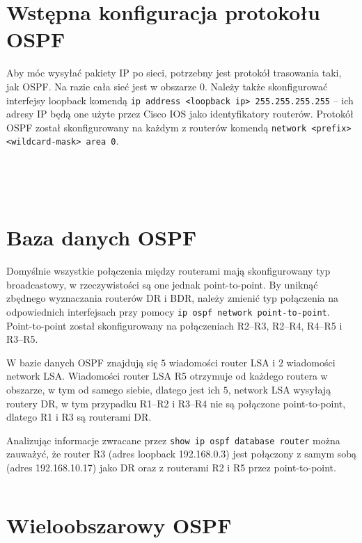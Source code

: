 \documentclass[a4paper,12pt,notitlepage]{article}
\begin{document}
\section{Wstępna konfiguracja protokołu OSPF}

Aby móc wysyłać pakiety IP po sieci, potrzebny jest protokół trasowania taki, jak OSPF. Na razie cała sieć jest w obszarze 0. Należy także skonfigurować interfejsy loopback komendą \texttt{ip address <loopback ip> 255.255.255.255} -- ich adresy IP będą one użyte przez Cisco IOS jako identyfikatory routerów. Protokół OSPF został skonfigurowany na każdym z routerów komendą \texttt{network <prefix> <wildcard-mask> area 0}.

\inputminted[label=Router R1, firstline=228, lastline=279]{text}{R1.txt}
\inputminted[label=Router R2, firstline=366, lastline=422]{text}{R2_1.txt}
\inputminted[label=Router R3, firstline=286, lastline=341]{text}{R3.txt}
\inputminted[label=Router R4, firstline=269, lastline=324]{text}{R4.txt}
\inputminted[label=Router R5, firstline=285, lastline=339]{text}{R5.txt}

\section{Baza danych OSPF}

Domyślnie wszystkie połączenia między routerami mają skonfigurowany typ broadcastowy, w rzeczywistości są one jednak point-to-point. By uniknąć zbędnego wyznaczania routerów DR i BDR, należy zmienić typ połączenia na odpowiednich interfejsach przy pomocy \texttt{ip ospf network point-to-point}. Point-to-point został skonfigurowany na połączeniach R2--R3, R2--R4, R4--R5 i R3--R5.

W bazie danych OSPF znajdują się $5$ wiadomości router LSA i $2$ wiadomości network LSA. Wiadomości router LSA R5 otrzymuje od każdego routera w obszarze, w tym od samego siebie, dlatego jest ich $5$, network LSA wysyłają routery DR, w tym przypadku R1--R2 i R3--R4 nie są połączone point-to-point, dlatego R1 i R3 są routerami DR.

Analizując informacje zwracane przez \texttt{show ip ospf database router} można zauważyć, że router R3 (adres loopback 192.168.0.3) jest połączony z samym sobą (adres 192.168.10.17) jako DR oraz z routerami R2 i R5 przez point-to-point.

\inputminted[label=Router R5, firstline=366, lastline=595]{text}{R5.txt}

\section{Wieloobszarowy OSPF}
\end{document}
